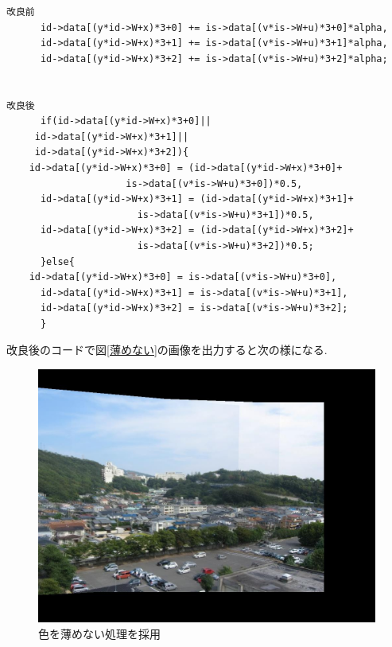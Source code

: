 \documentclass[a4j]{jarticle}
\begin{document}
{\baselineskip 2mm
\begin{verbatim}
改良前
      id->data[(y*id->W+x)*3+0] += is->data[(v*is->W+u)*3+0]*alpha,
      id->data[(y*id->W+x)*3+1] += is->data[(v*is->W+u)*3+1]*alpha,
      id->data[(y*id->W+x)*3+2] += is->data[(v*is->W+u)*3+2]*alpha;


改良後
      if(id->data[(y*id->W+x)*3+0]||
	 id->data[(y*id->W+x)*3+1]||
	 id->data[(y*id->W+x)*3+2]){
	id->data[(y*id->W+x)*3+0] = (id->data[(y*id->W+x)*3+0]+
				     is->data[(v*is->W+u)*3+0])*0.5,
	  id->data[(y*id->W+x)*3+1] = (id->data[(y*id->W+x)*3+1]+
				       is->data[(v*is->W+u)*3+1])*0.5,
	  id->data[(y*id->W+x)*3+2] = (id->data[(y*id->W+x)*3+2]+
				       is->data[(v*is->W+u)*3+2])*0.5;
      }else{
	id->data[(y*id->W+x)*3+0] = is->data[(v*is->W+u)*3+0],
	  id->data[(y*id->W+x)*3+1] = is->data[(v*is->W+u)*3+1],
	  id->data[(y*id->W+x)*3+2] = is->data[(v*is->W+u)*3+2];
      }

\end{verbatim}
}

改良後のコードで図\ref{薄めない}の画像を出力すると次の様になる.

\begin{figure}[h]
\begin{center}
\includegraphics[bb=0 0 1024 768,scale=.4]{out012.jpg}
\caption{色を薄めない処理を採用}
\end{center}
\end{figure}
\end{document}
